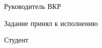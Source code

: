 \intervalS%

Руководитель ВКР \uline{\hspace*{0.1\textheight} \Supervisor}





\intervalS%


Задание принял к исполнению \uline{\thesisStartDate}

\intervalS%

Студент \uline{\hspace*{0.1\textheight}  \Author}



